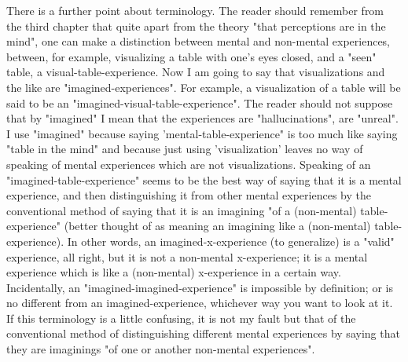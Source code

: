 \documentclass[10pt,twoside]{memoir}
\begin{document}
\begin{enumerate}
{There is a further point about terminology. The reader should 
remember from the third chapter that quite apart from the theory "that 
perceptions are in the mind", one can make a distinction between mental 
and non-mental experiences, between, for example, visualizing a table with 
one's eyes closed, and a "seen" table, a visual-table-experience. Now I am 
going to say that visualizations and the like are "imagined-experiences". For 
example, a visualization of a table will be said to be an 
"imagined-visual-table-experience". The reader should not suppose that by 
"imagined" I mean that the experiences are "hallucinations", are "unreal". I 
use "imagined" because saying 'mental-table-experience" is too much like 
saying "table in the mind" and because just using 'visualization' leaves no way 
of speaking of mental experiences which are not visualizations. Speaking of 
an "imagined-table-experience" seems to be the best way of saying that it is 
a mental experience, and then distinguishing it from other mental 
experiences by the conventional method of saying that it is an imagining "of 
a (non-mental) table-experience" (better thought of as meaning an imagining 
like a  (non-mental)  table-experience). In other words, an 
imagined-x-experience (to generalize) is a "valid" experience, all right, but it 
is not a non-mental x-experience; it is a mental experience which is like a 
(non-mental) x-experience in a certain way. Incidentally, an "imagined-imagined-experience" is impossible by definition; or is no different from an 
imagined-experience, whichever way you want to look at it. If this 
terminology is a little confusing, it is not my fault but that of the 
conventional method of distinguishing different mental experiences by 
saying that they are imaginings "of one or another non-mental experiences". 

}
\end{enumerate}
\end{document}
